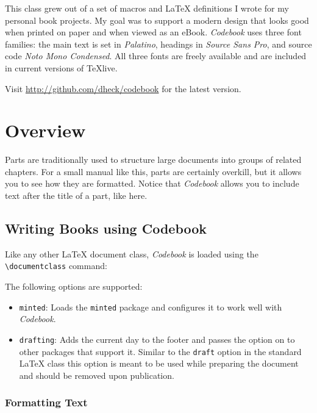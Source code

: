 \documentclass[minted]{codebook}
\begin{document}
This class grew out of a set of macros and \LaTeX{} definitions I wrote for my personal book projects.
My goal was to support a modern design that looks good when printed on paper and when viewed as an eBook.
\emph{Codebook} uses three font families: the main text is set in \emph{Palatino}, headings in \emph{Source Sans Pro}, and source code \emph{Noto Mono Condensed}.
All three fonts are freely available and are included in current versions of \TeX{}live.

Visit \url{http://github.com/dheck/codebook} for the latest version.


\mainmatter

\part{Overview}

Parts are traditionally used to structure large documents into groups of related chapters.
For a small manual like this, parts are certainly overkill, but it allows you to see how they are formatted.
Notice that \emph{Codebook} allows you to include text after the title of a part, like here.


\chapter{Writing Books using Codebook}


Like any other \LaTeX{} document class, \emph{Codebook} is loaded using the \verb|\documentclass| command:
The following options are supported:
\begin{itemize}
  \item \texttt{minted}: Loads the \texttt{minted} package and configures it to work well with \emph{Codebook}.
  \item \texttt{drafting}: Adds the current day to the footer and passes the option on to other packages that support it.
  Similar to the \verb|draft| option in the standard \LaTeX{} class this option is meant to be used while preparing the document and should be removed upon publication.
\end{itemize}



\section{Formatting Text}
\end{document}
